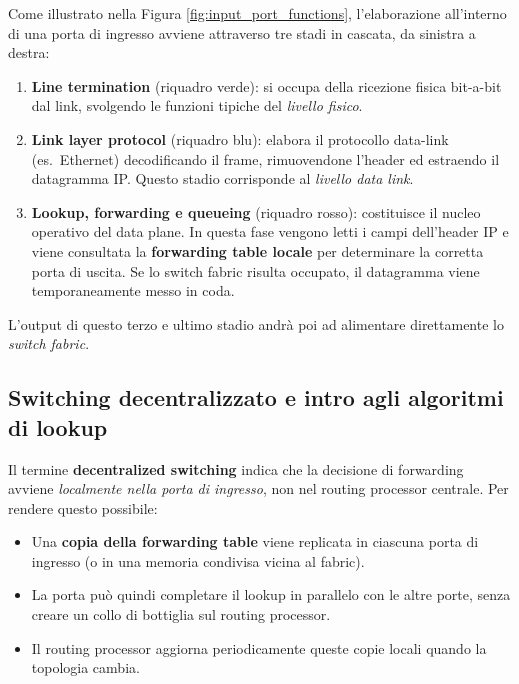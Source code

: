 \documentclass[a4paper,12pt]{report}
\begin{document}
Come illustrato nella Figura \ref{fig:input_port_functions}, l'elaborazione all'interno di una porta di ingresso avviene attraverso tre stadi in cascata, da sinistra a destra:

\begin{enumerate}
    \item \textbf{Line termination} (riquadro verde): si occupa della ricezione fisica bit-a-bit dal link, svolgendo le funzioni tipiche del \textit{livello fisico}.
    \item \textbf{Link layer protocol} (riquadro blu): elabora il protocollo data-link (es.\ Ethernet) decodificando il frame, rimuovendone l'header ed estraendo il datagramma IP. Questo stadio corrisponde al \textit{livello data link}.
    \item \textbf{Lookup, forwarding e queueing} (riquadro rosso): costituisce il nucleo operativo del data plane. In questa fase vengono letti i campi dell'header IP e viene consultata la \textbf{forwarding table locale} per determinare la corretta porta di uscita. Se lo switch fabric risulta occupato, il datagramma viene temporaneamente messo in coda.
\end{enumerate}

L'output di questo terzo e ultimo stadio andrà poi ad alimentare direttamente lo \textit{switch fabric}.

\newpage
\subsection{Switching decentralizzato e intro agli algoritmi di lookup}

Il termine \textbf{decentralized switching} indica che la decisione di
forwarding avviene \emph{localmente nella porta di ingresso}, non nel
routing processor centrale. Per rendere questo possibile:

\begin{itemize}
    \item Una \textbf{copia della forwarding table} viene replicata in
          ciascuna porta di ingresso (o in una memoria condivisa vicina
          al fabric).
    \item La porta può quindi completare il lookup in parallelo con le
          altre porte, senza creare un collo di bottiglia sul routing
          processor.
    \item Il routing processor aggiorna periodicamente queste copie
          locali quando la topologia cambia.
\end{itemize}
\end{document}
